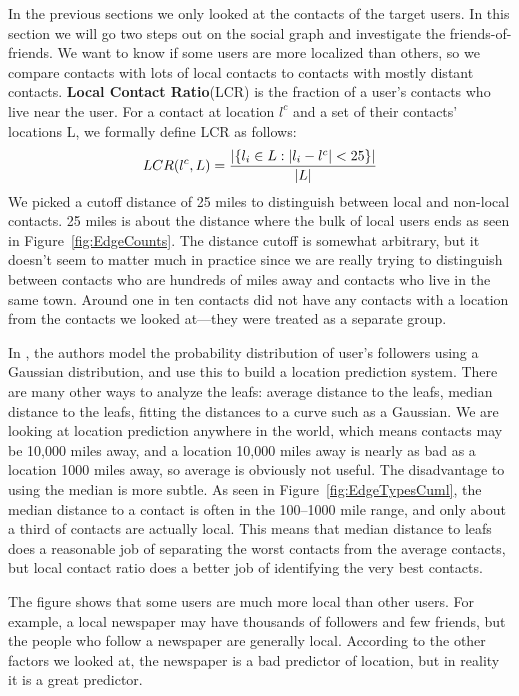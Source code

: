 \documentclass[letterpaper]{article}
\begin{document}
In the previous sections we only looked at the contacts of the target
users.
%
In this section we will go two steps out on the social graph and
investigate the friends-of-friends.
%
We want to know if some users are more localized than others, so we compare
contacts with lots of local contacts to contacts with mostly distant contacts.
%
\textbf{Local Contact Ratio}(LCR) is the fraction of a user's contacts
who live near the user.
%
For a contact at location $l^c$ and a set of their contacts' locations L, we
formally define LCR as follows:
\[
    LCR(l^c,L) = { |\{ l_i \in L : |l_i-l^c|<25 \}|
                    \over |L| }
\]
%
We picked a cutoff distance of 25 miles to distinguish between local and non-local
contacts.
25 miles is about the distance where the bulk of local users ends as seen in
Figure~\ref{fig:EdgeCounts}.
%
The distance cutoff is somewhat arbitrary, but it doesn't seem to matter much
in practice since we are really trying to distinguish between contacts who are
hundreds of miles away and contacts who live in the same town.
%
Around one in ten contacts did not have any contacts with a location from the
contacts we looked at---they were treated as a separate group.

In \cite{li2012towards}, the authors model the probability distribution of
user's followers using a Gaussian distribution, and use this to build a
location prediction system.
%
There are many other ways to analyze the leafs: average distance to the leafs,
median distance to the leafs, fitting the distances to a curve such as a
Gaussian.
%
We are looking at location prediction anywhere in the world, which means
contacts may be 10,000 miles away, and a location 10,000 miles away is nearly
as bad as a location 1000 miles away, so average is obviously not useful.
%
The disadvantage to using the median is more subtle.
%
As seen in Figure~\ref{fig:EdgeTypesCuml}, the median distance to a contact is
often in the 100--1000 mile range, and only about a third of contacts are
actually local.
%
This means that median distance to leafs does a reasonable job of separating the
worst contacts from the average contacts, but local contact ratio does a better
job of identifying the very best contacts.

The figure shows that some users are much more local than other users.
For example, a local newspaper may have thousands of followers and few friends,
but the people who follow a newspaper are generally local.
According to the other factors we looked at, the newspaper is a bad predictor
of location, but in reality it is a great predictor.
\end{document}
